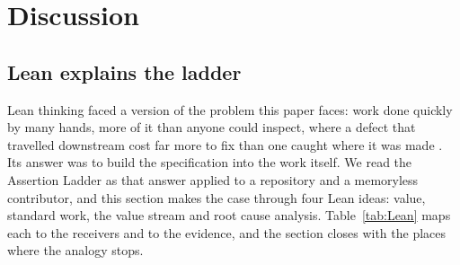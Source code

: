 \section{Discussion}\label{sec:discussion}

\subsection{Lean explains the ladder}

Lean thinking faced a version of the problem this paper faces: work done quickly by many hands,
more of it than anyone could inspect, where a defect that travelled downstream cost far more to
fix than one caught where it was made \citep{ohno1988tps,womack1996lean}. Its answer was to build
the specification into the work itself. We read the Assertion Ladder as that answer applied to
a repository and a memoryless contributor, and this section makes the case through four Lean
ideas: value, standard work, the value stream and root cause analysis. Table~\ref{tab:Lean} maps each to the
receivers and to the evidence, and the section closes with the places where the analogy stops.

